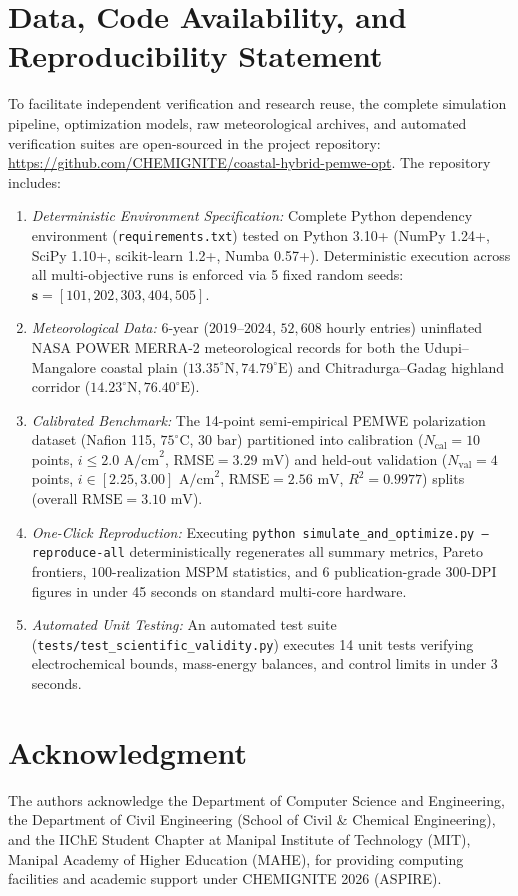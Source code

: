 \documentclass[conference]{IEEEtran}
\begin{document}
\section*{Data, Code Availability, and Reproducibility Statement}
To facilitate independent verification and research reuse, the complete simulation pipeline, optimization models, raw meteorological archives, and automated verification suites are open-sourced in the project repository: \url{https://github.com/CHEMIGNITE/coastal-hybrid-pemwe-opt}. 
The repository includes:
\begin{enumerate}
    \item \textit{Deterministic Environment Specification:} Complete Python dependency environment (\texttt{requirements.txt}) tested on Python 3.10+ (NumPy 1.24+, SciPy 1.10+, scikit-learn 1.2+, Numba 0.57+). Deterministic execution across all multi-objective runs is enforced via 5 fixed random seeds: $\mathbf{s} = [101, 202, 303, 404, 505]$.
    \item \textit{Meteorological Data:} 6-year ($2019$--$2024$, $52,608$ hourly entries) uninflated NASA POWER MERRA-2 meteorological records for both the Udupi--Mangalore coastal plain ($13.35^\circ\text{N}, 74.79^\circ\text{E}$) and Chitradurga--Gadag highland corridor ($14.23^\circ\text{N}, 76.40^\circ\text{E}$).
    \item \textit{Calibrated Benchmark:} The 14-point semi-empirical PEMWE polarization dataset (Nafion 115, $75^\circ\text{C}$, $30\text{ bar}$) partitioned into calibration ($N_{\text{cal}}=10$ points, $i \le 2.0\text{ A/cm}^2$, $\text{RMSE} = 3.29\text{ mV}$) and held-out validation ($N_{\text{val}}=4$ points, $i \in [2.25, 3.00]\text{ A/cm}^2$, $\text{RMSE} = 2.56\text{ mV}$, $R^2 = 0.9977$) splits (overall $\text{RMSE} = 3.10\text{ mV}$).
    \item \textit{One-Click Reproduction:} Executing \texttt{python simulate\_and\_optimize.py --reproduce-all} deterministically regenerates all summary metrics, Pareto frontiers, $100$-realization MSPM statistics, and 6 publication-grade 300-DPI figures in under 45 seconds on standard multi-core hardware.
    \item \textit{Automated Unit Testing:} An automated test suite (\texttt{tests/test\_scientific\_validity.py}) executes 14 unit tests verifying electrochemical bounds, mass-energy balances, and control limits in under 3 seconds.
\end{enumerate}

\section*{Acknowledgment}
The authors acknowledge the Department of Computer Science and Engineering, the Department of Civil Engineering (School of Civil \& Chemical Engineering), and the IIChE Student Chapter at Manipal Institute of Technology (MIT), Manipal Academy of Higher Education (MAHE), for providing computing facilities and academic support under CHEMIGNITE 2026 (ASPIRE).
\end{document}
